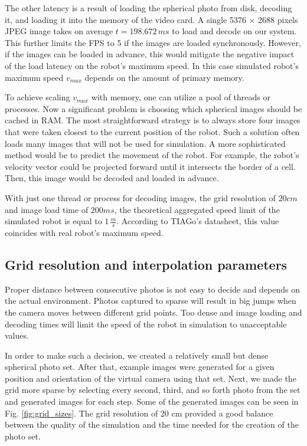 \documentclass{svproc}
\begin{document}
The other latency is a result of loading the spherical photo from disk, decoding it, and loading it into the memory of the video card.
A single 5376 $\times$ 2688 pixels JPEG image takes on average $t = 198.672\,ms$ to load and decode on our system.
This further limits the FPS to 5 if the images are loaded synchronously.
However, if the images can be loaded in advance, this would mitigate the negative impact of the load latency on the robot's maximum speed.
In this case simulated robot's maximum speed $v_{max}$ depends on the amount of primary memory.

To achieve scaling $v_{max}$ with memory, one can utilize a pool of threads or processes.
Now a significant problem is choosing which spherical images should be cached in RAM.
The most straightforward strategy is to always store four images that were taken closest to the current position of the robot.
Such a solution often loads many images that will not be used for simulation.
A more sophisticated method would be to predict the movement of the robot.
For example, the robot's velocity vector could be projected forward until it intersects the border of a cell.
Then, this image would be decoded and loaded in advance.

With just one thread or process for decoding images, the grid resolution of $20 cm$ and image load time of $200 ms$, the theoretical aggregated speed limit of the simulated robot is equal to $1\,\frac{m}{s}$.
According to TIAGo's datasheet, this value coincides with real robot's maximum speed.

\subsection{Grid resolution and interpolation parameters}

Proper distance between consecutive photos is not easy to decide and depends on the
actual environment. Photos captured to sparse will result in big jumps when the camera
moves between different grid points. Too dense and image loading and decoding
times will limit the speed of the robot in simulation to unacceptable values.

In order to make such a decision, we created a relatively small but dense spherical photo set.
After that, example images were generated for a given position and orientation of the virtual camera using that set.
Next, we made the grid more sparse by selecting every second, third, and so forth photo from the set and generated images for each step.
Some of the generated images can be seen in Fig. \ref{fig:grid_sizes}.
The grid resolution of 20 cm provided a good balance between the quality of the simulation and the time needed for the creation of the photo set.
\end{document}
